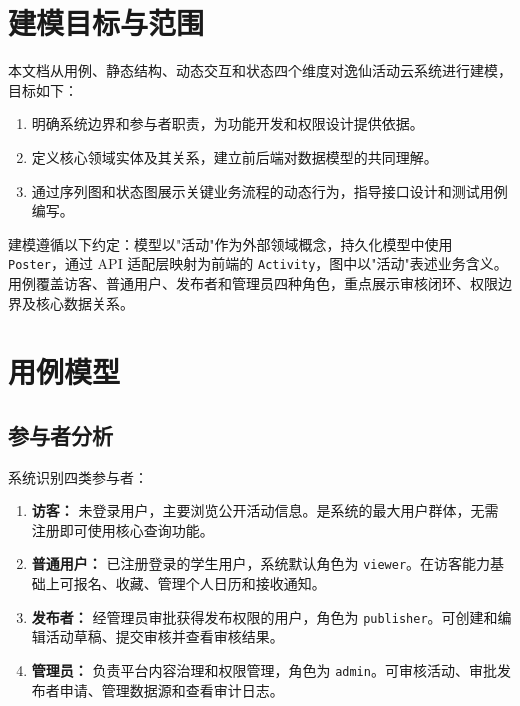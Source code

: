 \documentclass[12pt,a4paper]{ctexart}
\begin{document}
\tableofcontents\clearpage{}

\section{建模目标与范围}
本文档从用例、静态结构、动态交互和状态四个维度对逸仙活动云系统进行建模，目标如下：
\begin{enumerate}
\item 明确系统边界和参与者职责，为功能开发和权限设计提供依据。
\item 定义核心领域实体及其关系，建立前后端对数据模型的共同理解。
\item 通过序列图和状态图展示关键业务流程的动态行为，指导接口设计和测试用例编写。
\end{enumerate}
建模遵循以下约定：模型以"活动"作为外部领域概念，持久化模型中使用 \texttt{Poster}，通过 API 适配层映射为前端的 \texttt{Activity}，图中以"活动"表述业务含义。用例覆盖访客、普通用户、发布者和管理员四种角色，重点展示审核闭环、权限边界及核心数据关系。

\section{用例模型}
\subsection{参与者分析}
系统识别四类参与者：
\begin{enumerate}
\item \textbf{访客：} 未登录用户，主要浏览公开活动信息。是系统的最大用户群体，无需注册即可使用核心查询功能。
\item \textbf{普通用户：} 已注册登录的学生用户，系统默认角色为 \texttt{viewer}。在访客能力基础上可报名、收藏、管理个人日历和接收通知。
\item \textbf{发布者：} 经管理员审批获得发布权限的用户，角色为 \texttt{publisher}。可创建和编辑活动草稿、提交审核并查看审核结果。
\item \textbf{管理员：} 负责平台内容治理和权限管理，角色为 \texttt{admin}。可审核活动、审批发布者申请、管理数据源和查看审计日志。
\end{enumerate}
\end{document}

